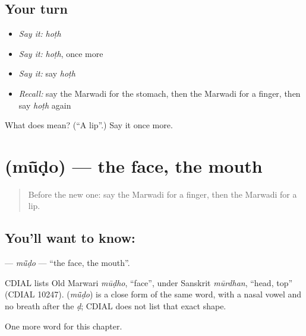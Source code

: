 \subsection*{Your turn}
\begin{itemize}
\raggedright
  \item \emph{Say it:} \emph{hoṭh}
  \item \emph{Say it:} \emph{hoṭh}, once more
  \item \emph{Say it:} say \emph{hoṭh}
  \item \emph{Recall:} say the Marwadi for the stomach, then the Marwadi for a finger, then say \emph{hoṭh} again
\end{itemize}

\begin{tcolorbox}[breakable,colback=teal!4,colframe=teal!35!black,title={Before you move on}]
What does  mean? (\textquotedblleft{}A lip\textquotedblright{}.) Say it once more.
\end{tcolorbox}
\section[\texorpdfstring{\mw{मूंडो} (mū̃ḍo)}{मूंडो (mū̃ḍo)}]{ (mū̃ḍo) — the face, the mouth}

\label{lesson:MW-C45-mudo}



\begin{quote}
Before the new one: say the Marwadi for a finger, then the Marwadi for a lip.
\end{quote}

\subsection*{You'll want to know: }
\textbf{} — \emph{mū̃ḍo} — \textquotedblleft{}the face, the mouth\textquotedblright{}.

\begin{cousinweb}
CDIAL lists Old Marwari \emph{mūḍho}, \textquotedblleft{}face\textquotedblright{}, under Sanskrit \emph{mūrdhan}, \textquotedblleft{}head, top\textquotedblright{} (CDIAL 10247). \textbf{} (\emph{mū̃ḍo}) is a close form of the same word, with a nasal vowel and no breath after the \emph{ḍ}; CDIAL does not list that exact shape.
\end{cousinweb}

\begin{grammarlens}[title={What you've built}]
One more word for this chapter.
\end{grammarlens}

